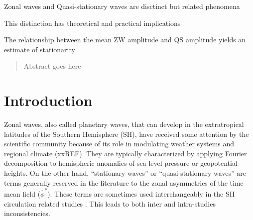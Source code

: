 \documentclass[draft,linenumbers]{agujournal2018}
\begin{document}



\begin{keypoints}
\item Zonal waves and Quasi-stationary waves are disctinct but related
phenomena
\item This distinction has theoretical and practical implications
\item The relationship between the mean ZW amplitude and QS amplitude yields
an estimate of stationarity
\end{keypoints}

%
%


\begin{abstract}
Abstract goes here
\end{abstract}

\section{Introduction}

Zonal waves, also called planetary waves, that can develop in the
extratropical latitudes of the Southern Hemisphere (SH), have received
some attention by the scientific community because of its role in
modulating weather systems and regional climate (xxREF). They are
typically characterized by applying Fourier decomposition to hemispheric
anomalies of sea-level pressure or geopotential heights. On the other
hand, ``stationary waves'' or ``quasi-stationary waves'' are terms
generally reserved in the literature to the zonal asymmetries of the
time mean field (\(\overline{\phi}^*\)). These terms are sometimes used
interchangeably in the SH circulation related studies
\citep[e.g.][]{Rao2004, Raphael2004, Kravchenko2012, Irving2015, Turner2017, Lastovicka2018}.
This leads to both inter and intra-studies inconsistencies.
\end{document}
